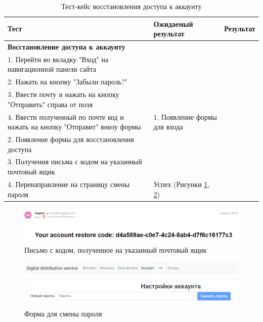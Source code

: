 \begin{table}[!htb]
	\caption{Тест-кейс восстановления доступа к аккаунту}
	\label{table:testing:func:test3}
	\centering
	  \begin{tabular}{| >{\raggedright}m{} 
					  | >{\raggedright}m{} 
					  | >{\raggedright\arraybackslash}m{}|}
	  \hline Тест & Ожидаемый результат  & Результат \\
	  \hline \textbf{Восстановление доступа к аккаунту} \\ 1. Перейти во вкладку "Вход" на навигационной панели сайта \\ 2. Нажать на кнопку "Забыли пароль?" \\ 3. Ввести почту и нажать на кнопку "Отправить" справа от поля \\ 4. Ввести полученный по почте код и нажать на кнопку "Отправит" внизу формы & 1. Появление формы для входа \\ 2. Появление формы для восстановления доступа \\ 3. Получения письма с кодом на указанный почтовый ящик \\ 4. Перенаправление на страницу смены пароля & Успех (Рисунки \ref*{sec:testing:func:mailmsg}, \ref*{sec:testing:func:passwordchange})\\
	  \hline
	  \end{tabular}
\end{table}

\begin{figure}[!htb]
	\centering
	  \includegraphics[scale=0.45]{attachments/mailmsg.png}  
	  \caption{ Письмо с кодом, полученное на указанный почтовый ящик }
	  \label{sec:testing:func:mailmsg}
\end{figure}
\clearpage
\begin{figure}[!ht]
	\centering
	  \includegraphics[scale=0.5]{attachments/passwordchange.png}  
	  \caption{ Форма для смены пароля }
	  \label{sec:testing:func:passwordchange}
\end{figure}

